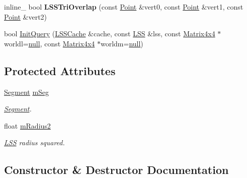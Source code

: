 \begin{DoxyCompactItemize}
\item 
inline\+\_\+ bool {\bfseries L\+S\+S\+Tri\+Overlap} (const \hyperlink{classOpcode_1_1Point}{Point} \&vert0, const \hyperlink{classOpcode_1_1Point}{Point} \&vert1, const \hyperlink{classOpcode_1_1Point}{Point} \&vert2)\hypertarget{classOpcode_1_1LSSCollider_a30a79d8f1f7ed8e4636a0435d44c5183}{}\label{classOpcode_1_1LSSCollider_a30a79d8f1f7ed8e4636a0435d44c5183}

\item 
bool \hyperlink{classOpcode_1_1LSSCollider_ae4fbd3111a8d0b680b8c6a3cfa0e4884}{Init\+Query} (\hyperlink{structOpcode_1_1LSSCache}{L\+S\+S\+Cache} \&cache, const \hyperlink{classOpcode_1_1LSS}{L\+SS} \&lss, const \hyperlink{classOpcode_1_1Matrix4x4}{Matrix4x4} $\ast$worldl=\hyperlink{IceTypes_8h_ac97b8ee753e4405397a42ad5799b0f9e}{null}, const \hyperlink{classOpcode_1_1Matrix4x4}{Matrix4x4} $\ast$worldm=\hyperlink{IceTypes_8h_ac97b8ee753e4405397a42ad5799b0f9e}{null})
\end{DoxyCompactItemize}
\subsection*{Protected Attributes}
\begin{DoxyCompactItemize}
\item 
\hyperlink{classOpcode_1_1Segment}{Segment} \hyperlink{classOpcode_1_1LSSCollider_ae3d52d77955e3a0a811b1d46c941b254}{m\+Seg}\hypertarget{classOpcode_1_1LSSCollider_ae3d52d77955e3a0a811b1d46c941b254}{}\label{classOpcode_1_1LSSCollider_ae3d52d77955e3a0a811b1d46c941b254}

\begin{DoxyCompactList}\small\item\em \hyperlink{classOpcode_1_1Segment}{Segment}. \end{DoxyCompactList}\item 
float \hyperlink{classOpcode_1_1LSSCollider_a5536bbc8db3b11dbcb3bc5b44ba9249a}{m\+Radius2}\hypertarget{classOpcode_1_1LSSCollider_a5536bbc8db3b11dbcb3bc5b44ba9249a}{}\label{classOpcode_1_1LSSCollider_a5536bbc8db3b11dbcb3bc5b44ba9249a}

\begin{DoxyCompactList}\small\item\em \hyperlink{classOpcode_1_1LSS}{L\+SS} radius squared. \end{DoxyCompactList}\end{DoxyCompactItemize}


\subsection{Constructor \& Destructor Documentation}
